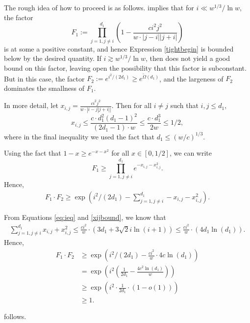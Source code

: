 The rough idea of how to proceed is as follows. 
implies that for $i \ll w^{1/3}/\ln w$, the factor
\begin{equation*}
F_1 := \prod_{j=1, j \neq i}^{d_1} \left(1-\frac{c i^2 j^2}{w \cdot |j-i|
|j+i|}\right)
\end{equation*}
is at some a positive constant, and hence Expression \eqref{tightbegin} is
bounded below by the desired quantity. If $i \gtrsim w^{1/3}/\ln w$, then
 does not yield a good bound on this factor, leaving
open the possibility that this factor is subconstant. But in this case, the
factor $F_2:= e^{i^2/(2d_1)} \geq e^{\tilde{\Omega}(d_1)}$, and the
largeness of $F_2$ dominates the smallness of $F_1$.

In more detail, let $x_{i, j} = \frac{ci^2j^2}{w \cdot |i-j| j+i||}$. Then
for all $i \neq j$ such that $i, j \leq d_1$,
\begin{equation}  \label{xijbound}
x_{i,j} \leq \frac{c \cdot d_1^2 (d_1-1)^2}{(2d_1-1) \cdot w} \leq \frac{c
\cdot d_1^3}{2w} \leq 1/2,
\end{equation}
where in the final inequality we used the fact that $d_1 \leq (w/c)^{1/3}$.

Using the fact that $1-x \geq e^{-x-x^2}$ for all $x \in [0, 1/2]$, we can
write
\begin{equation*}
F_1 \geq \prod_{j=1, j\neq i}^{d_1} e^{-x_{i,j} - x_{i, j}^2}.
\end{equation*}
Hence,
\begin{align*}
F_1 \cdot F_2 \geq \exp\left(i^2/(2d_1) - \sum_{j=1, j\neq i}^{d_1} -x_{i,j}
- x_{i, j}^2\right).
\end{align*}

From Equations \eqref{eq:ieq} and \eqref{xijbound}, we know that
\begin{align*}
\sum_{j=1, j\neq i}^{d_1} x_{i,j} + x_{i, j}^2 \leq \frac{c i^2}{w} \cdot
\left(3d_1 + 3 \sqrt{2} i \ln(i+1)\right) \leq \frac{ci^2}{w} \cdot \left(4
d_1 \ln(d_1)\right).
\end{align*}
Hence,
\begin{align*}
F_1 \cdot F_2 & \geq \exp\left(i^2/(2d_1) - \frac{ci^2}{w} \cdot 4 c
\ln(d_1)\right) \\
&= \exp\left(i^2 \left(\frac{1}{2d_1} - \frac{4c^2 \ln(d_1)}{w}\right)\right)
\\
& \geq \exp\left(i^2 \cdot \frac{1}{2d_1} \cdot (1-o(1))\right) \\
& \geq 1.
\end{align*}

 follows.



%
